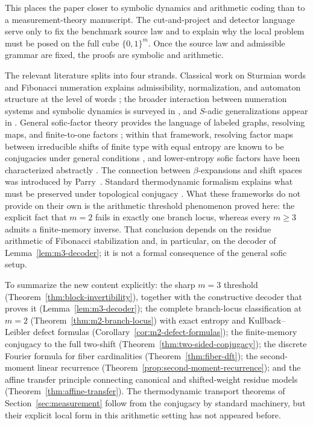 This places the paper closer to symbolic dynamics and arithmetic coding than to a measurement-theory manuscript. The cut-and-project and detector language serve only to fix the benchmark source law and to explain why the local problem must be posed on the full cube $\{0,1\}^m$. Once the source law and admissible grammar are fixed, the proofs are symbolic and arithmetic.

The relevant literature splits into four strands. Classical work on Sturmian words and Fibonacci numeration explains admissibility, normalization, and automaton structure at the level of words \cite{MorseHedlund1940,Lothaire2002,Queffelec2010,Frougny1992,Berstel2001}; the broader interaction between numeration systems and symbolic dynamics is surveyed in \cite{BertheRigo2010}, and $S$-adic generalizations appear in \cite{BertheSteinerThuswaldner2019}. General sofic-factor theory provides the language of labeled graphs, resolving maps, and finite-to-one factors \cite{LindMarcus1995,Kitchens1998,Nasu1995}; within that framework, resolving factor maps between irreducible shifts of finite type with equal entropy are known to be conjugacies under general conditions \cite{Ashley1988}, and lower-entropy sofic factors have been characterized abstractly \cite{Boyle1983}. The connection between $\beta$-expansions and shift spaces was introduced by Parry~\cite{Parry1960}. Standard thermodynamic formalism explains what must be preserved under topological conjugacy \cite{Walters1982}. What these frameworks do not provide on their own is the arithmetic threshold phenomenon proved here: the explicit fact that $m=2$ fails in exactly one branch locus, whereas every $m\ge 3$ admits a finite-memory inverse. That conclusion depends on the residue arithmetic of Fibonacci stabilization and, in particular, on the decoder of Lemma~\ref{lem:m3-decoder}; it is not a formal consequence of the general sofic setup.

To summarize the new content explicitly: the sharp $m=3$ threshold (Theorem~\ref{thm:block-invertibility}), together with the constructive decoder that proves it (Lemma~\ref{lem:m3-decoder}); the complete branch-locus classification at $m=2$ (Theorem~\ref{thm:m2-branch-locus}) with exact entropy and Kullback--Leibler defect formulas (Corollary~\ref{cor:m2-defect-formulas}); the finite-memory conjugacy to the full two-shift (Theorem~\ref{thm:two-sided-conjugacy}); the discrete Fourier formula for fiber cardinalities (Theorem~\ref{thm:fiber-dft}); the second-moment linear recurrence (Theorem~\ref{prop:second-moment-recurrence}); and the affine transfer principle connecting canonical and shifted-weight residue models (Theorem~\ref{thm:affine-transfer}). The thermodynamic transport theorems of Section~\ref{sec:measurement} follow from the conjugacy by standard machinery, but their explicit local form in this arithmetic setting has not appeared before.

